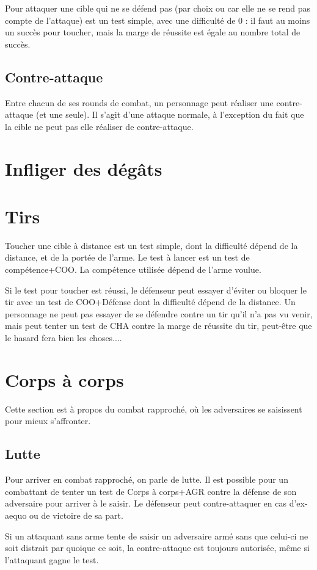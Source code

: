 \documentclass[10pt,a4paper,twocolumn]{book}
\begin{document}
Pour attaquer une cible qui ne se défend pas (par choix ou car elle ne se rend pas compte de l'attaque) est un test simple, avec une difficulté de 0 : il faut au moins un succès pour toucher, mais la marge de réussite est égale au nombre total de succès.
\subsection{Contre-attaque}
Entre chacun de ses rounds de combat, un personnage peut réaliser une contre-attaque (et une seule). Il s'agit d'une attaque normale, à l'exception du fait que la cible ne peut pas elle réaliser de contre-attaque.
\section{Infliger des dégâts}

\section{Tirs}
Toucher une cible à distance est un test simple, dont la difficulté dépend de la distance, et de la portée de l'arme. Le test à lancer est un test de compétence+COO. La compétence utilisée dépend de l'arme voulue.

Si le test pour toucher est réussi, le défenseur peut essayer d'éviter ou bloquer le tir avec un test de COO+Défense dont la difficulté dépend de la distance. Un personnage ne peut pas essayer de se défendre contre un tir qu'il n'a pas vu venir, mais peut tenter un test de CHA contre la marge de réussite du tir, peut-être que le hasard fera bien les choses....


\section{Corps à corps}
Cette section est à propos du combat rapproché, où les adversaires se saisissent pour mieux s'affronter.
\subsection{Lutte}
Pour arriver en combat rapproché, on parle de lutte. Il est possible pour un combattant de tenter un test de Corps à corps+AGR contre la défense de son adversaire pour arriver à le saisir. Le défenseur peut contre-attaquer en cas d'ex-aequo ou de victoire de sa part. 

Si un attaquant sans arme tente de saisir un adversaire armé sans que celui-ci ne soit distrait par quoique ce soit, la contre-attaque est toujours autorisée, même si l'attaquant gagne le test.
\end{document}
